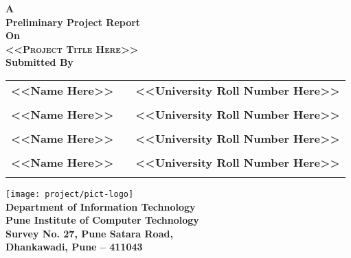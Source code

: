 
\newpage
\thispagestyle{empty}

\begin{center}

\LARGE{\textbf{A\\Preliminary Project Report\\On}}\\[1.0cm]
\Huge{\textsc {\textbf{<<Project Title Here>>}}}\\[1.0cm]
\LARGE{\textbf{Submitted By}}\\[1.0cm]

\begin{table}[h]\Large
\centering
\begin{tabular}{>{\bfseries}lc>{\bfseries}r}
<<Name Here>>& & <<University Roll Number Here>>\\\\ %
<<Name Here>>& & <<University Roll Number Here>>\\\\ %
<<Name Here>>& & <<University Roll Number Here>>\\\\ %
<<Name Here>>& & <<University Roll Number Here>>\\\\ %
\end{tabular}
\end{table}




\texttt{[image: project/pict-logo]}\\[1cm]
\LARGE{\textbf{Department of Information Technology}}\\[1cm]
\LARGE{\textbf{Pune Institute of Computer Technology}}\\
\Large{\textbf{Survey No. 27, Pune Satara Road,}}\\
\Large{\textbf{Dhankawadi, Pune – 411043}}

\vspace{0.5cm}

\end{center}


